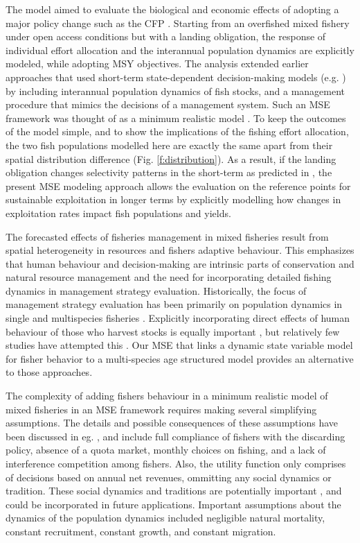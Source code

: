 \documentclass[12pt,oneline,a4paper,numbib]{ouparticle}
\numberwithin{equation}{subsection} %
\begin{document}
The model aimed to evaluate the biological and economic effects of adopting a major policy change such as the CFP \cite{CFP2013}. Starting from an overfished mixed fishery under open access conditions but with a landing obligation, the response of individual effort allocation and the interannual population dynamics are explicitly modeled, while adopting MSY objectives. The analysis extended earlier approaches that used short-term state-dependent decision-making models (e.g. \cite{Alzorriz2018, Batsleer2016, Poos2010}) by including interannual population dynamics of fish stocks, and a management procedure that mimics the decisions of a management system. Such an MSE framework was thought of as a minimum realistic model \cite{Kell2007, Punt1995}. To keep the outcomes of the model simple, and to show the implications of the fishing effort allocation, the two fish populations modelled here are exactly the same apart from their spatial distribution difference (Fig. \ref{f:distribution}). As a result, if the landing obligation changes selectivity patterns in the short-term as predicted in \cite{Alzorriz2018, Batsleer2016}, the present MSE modeling approach allows the evaluation on the reference points for sustainable exploitation in longer terms by explicitly modelling how changes in exploitation rates impact fish populations and yields. 

The forecasted effects of fisheries management in mixed fisheries result from spatial heterogeneity in resources and fishers adaptive behaviour. This emphasizes that human behaviour and decision-making are intrinsic parts of conservation and natural resource management and the need for incorporating detailed fishing dynamics in management strategy evaluation. Historically, the focus of management strategy evaluation has been primarily on population dynamics in single and multispecies fisheries \cite{Butterworth2007, Dichmont2006b, Punt1999, Punt2009, Smith1999, Punt2016}. Explicitly incorporating direct effects of human behaviour of those who harvest stocks is equally important \cite{Fulton2011,Milner-Gulland2012, Link2017}, but relatively few studies have attempted this \cite{Andersen2010, Ono2018, Simons2015a}. Our MSE that links a dynamic state variable model for fisher behavior to a multi-species age structured model provides an alternative to those approaches. 

The complexity of adding fishers behaviour in a minimum realistic model of mixed fisheries in an MSE framework requires making several simplifying assumptions. The details and possible consequences of these assumptions have been discussed in eg. \cite{Alzorriz2018}, and include full compliance of fishers with the discarding policy, absence of a quota market, monthly choices on fishing, and a lack of interference competition among fishers. Also, the utility function only comprises of decisions based on annual net revenues, ommitting any social dynamics or tradition. These social dynamics and traditions are potentially important \cite{Girardin2017, Schluter2012}, and could be incorporated in future applications. Important assumptions about the dynamics of the population dynamics included negligible natural mortality, constant recruitment, constant growth, and constant migration. 
\end{document}
